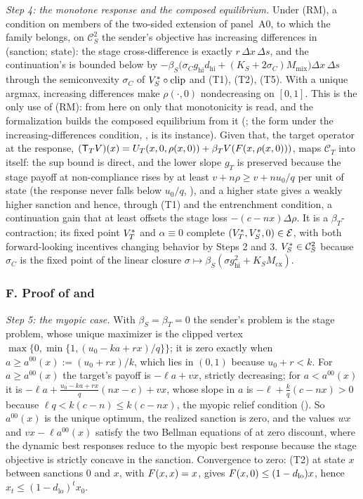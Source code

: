 \emph{Step 4: the monotone response and the composed equilibrium.} Under
(RM), a condition on members of the two-sided extension of panel~A0, to which
the family belongs, on $\mathcal C_S^2$ the sender's objective has increasing
differences in
(sanction; state): the stage cross-difference is exactly $r\,\Delta x\,\Delta s$,
and the continuation's is bounded below by
$-\beta_S\bigl(\sigma_Cg_{\mathrm{hi}}d_{\mathrm{hi}}+(K_S+2\sigma_C)M_{\mathrm{mix}}\bigr)\Delta x\,\Delta s$
through the semiconvexity $\sigma_C$ of $V_S^\ast\circ\operatorname{clip}$ and
(T1), (T2), (T5). With a unique argmax, increasing differences make
$\rho(\cdot,0)$ nondecreasing on $[0,1]$. This is the only use of (RM): from
here on only that monotonicity is read, and the formalization builds the
composed equilibrium from it (; the form under the increasing-differences
condition, , is its instance). Given that, the target operator at
the response, $(\mathsf T_TV)(x)=U_T(x,0,\rho(x,0))+\beta_TV(F(x,\rho(x,0)))$,
maps $\mathcal C_T$ into itself: the sup bound is direct, and the lower slope
$g_T$ is preserved because the stage payoff at non-compliance rises by at least
$v+n\rho\ge v+nu_0/q$ per unit of state (the response never falls below
$u_0/q$, ), and a higher state gives a weakly
higher sanction and hence, through (T1) and the entrenchment condition, a continuation
gain that at least offsets the stage loss $-(c-nx)\Delta\rho$. It is a
$\beta_T$-contraction;
its fixed point $V_T^\ast$ and $\alpha\equiv0$ complete
$(V_T^\ast,V_S^\ast,0)\in\mathcal E$, with both forward-looking incentives changing behavior by Steps 2
and 3. $V_S^\ast\in\mathcal C_S^2$ because $\sigma_C$ is the fixed point of
the linear closure $\sigma\mapsto\beta_S(\sigma g_{\mathrm{hi}}^2+K_SM_{\mathrm{cx}})$.

\subsubsection*{F. Proof of  and }

\emph{Step 5: the myopic case.} With $\beta_S=\beta_T=0$ the sender's
problem is the stage problem, whose unique maximizer is the clipped vertex
$\max\{0,\min\{1,(u_0-ka+rx)/q\}\}$; it is zero exactly when
$a\ge a^{00}(x):=(u_0+rx)/k$, which lies in $(0,1)$ because $u_0+r<k$. For
$a\ge a^{00}(x)$ the target's payoff is $-\ell a+vx$, strictly decreasing;
for $a<a^{00}(x)$ it is $-\ell a+\tfrac{u_0-ka+rx}q(nx-c)+vx$, whose slope
in $a$ is $-\ell+\tfrac kq(c-nx)>0$ because $\ell q<k(c-n)\le k(c-nx)$, the
myopic relief condition (). So
$a^{00}(x)$ is the unique optimum, the realized sanction is zero, and the
values $wx$ and $vx-\ell a^{00}(x)$ satisfy the two Bellman equations of
 at zero discount, where the dynamic best responses reduce to the
myopic best response because the stage objective is strictly concave in the
sanction. Convergence to zero: (T2) at state $x$ between sanctions $0$ and $x$, with
$F(x,x)=x$, gives $F(x,0)\le(1-d_{\mathrm{lo}})x$, hence
$x_t\le(1-d_{\mathrm{lo}})^tx_0$.

